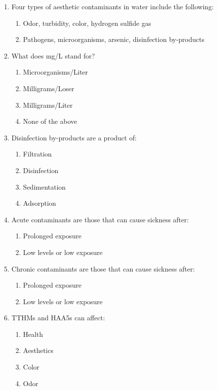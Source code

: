 \documentclass[10pt]{article}
\begin{document}
\begin{enumerate}
\begin{enumerate}
\item Four types of aesthetic contaminants in water include the following:
\begin{enumerate}
\item Odor, turbidity, color, hydrogen sulfide gas
\item Pathogens, microorganisms, arsenic, disinfection by-products
\end{enumerate}

\item What does mg/L stand for?
\begin{enumerate}
\item Microorganisms/Liter
\item Milligrams/Loser
\item Milligrams/Liter
\item None of the above
\end{enumerate}

\item Disinfection by-products are a product of:
\begin{enumerate}
\item Filtration
\item Disinfection
\item Sedimentation
\item Adsorption
\end{enumerate}

\item Acute contaminants are those that can cause sickness after:
\begin{enumerate}
\item Prolonged exposure
\item Low levels or low exposure
\end{enumerate}

\item Chronic contaminants are those that can cause sickness after:
\begin{enumerate}
\item Prolonged exposure
\item Low levels or low exposure
\end{enumerate}

\item TTHMs and HAA5s can affect:
\begin{enumerate}
\item Health
\item Aesthetics
\item Color
\item Odor
\end{enumerate}


\end{enumerate}
\end{enumerate}
\end{document}
